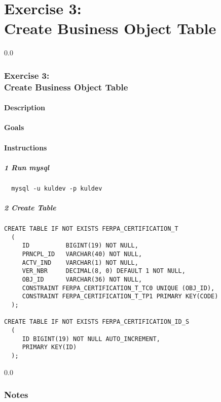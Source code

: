 \part*{Exercise 3: \\
Create Business Object Table}

{\setlength{\baselineskip}%
  {0.0\baselineskip}
  \section*{\flushright Exercise 3: \\
Create Business Object Table}
  \hrulefill \par}

\subsection*{Description}

\subsection*{Goals}

\subsection*{Instructions}
\subsubsection*{1 Run mysql}
\begin{verbatim}
  mysql -u kuldev -p kuldev
\end{verbatim}

\subsubsection*{2 Create Table}
\begin{verbatim}
CREATE TABLE IF NOT EXISTS FERPA_CERTIFICATION_T
  (
     ID          BIGINT(19) NOT NULL,
     PRNCPL_ID   VARCHAR(40) NOT NULL,
     ACTV_IND    VARCHAR(1) NOT NULL,
     VER_NBR     DECIMAL(8, 0) DEFAULT 1 NOT NULL,
     OBJ_ID      VARCHAR(36) NOT NULL,
     CONSTRAINT FERPA_CERTIFICATION_T_TC0 UNIQUE (OBJ_ID),
     CONSTRAINT FERPA_CERTIFICATION_T_TP1 PRIMARY KEY(CODE)
  );

CREATE TABLE IF NOT EXISTS FERPA_CERTIFICATION_ID_S
  (
     ID BIGINT(19) NOT NULL AUTO_INCREMENT,
     PRIMARY KEY(ID)
  );
\end{verbatim}
\newpage
{\setlength{\baselineskip}%
  {0.0\baselineskip}
  \section*{Notes}
  \hrulefill \par}
